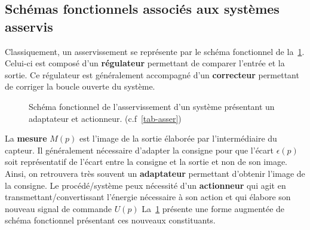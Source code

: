 \subsection{Schémas fonctionnels associés aux systèmes asservis}
Classiquement, un asservissement se représente par le schéma fonctionnel de 
la~\cref{fig-reg2}. Celui-ci est composé d'un \textbf{régulateur}
permettant de comparer l'entrée et la sortie. Ce régulateur est 
généralement accompagné d'un \textbf{correcteur}
permettant de corriger la boucle ouverte du système.
\begin{figure}[!h]
    \centering
    
    \caption{Schéma fonctionnel de l'asservissement d'un système 
             présentant un adaptateur et actionneur. (c.f~\cref{tab-asser})
             \label{fig-reg2}}
\end{figure}
%    
La \textbf{mesure} $M(p)$ est l'image de la sortie élaborée par 
l'intermédiaire du capteur. Il généralement nécessaire d'adapter 
la consigne pour que l'écart $\epsilon(p)$ soit représentatif de l'écart 
entre la consigne et la sortie et non de son image. Ainsi, on retrouvera 
très souvent un \textbf{adaptateur} permettant d'obtenir l'image 
de la consigne. Le procédé/système peux nécessité d'un \textbf{actionneur} qui 
agit en transmettant/convertissant l'énergie nécessaire à son action et qui
élabore son nouveau signal de commande $U(p)$
La~\cref{fig-reg2} présente une forme augmentée de schéma fonctionnel
présentant ces nouveaux constituants. 
